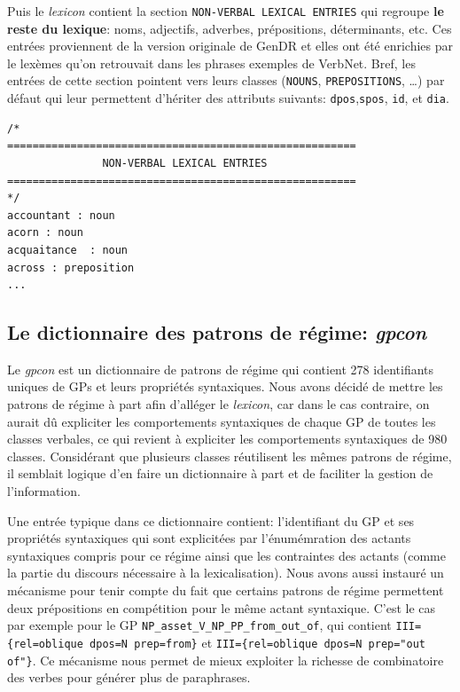 Puis le \emph{lexicon} contient la section \texttt{NON-VERBAL LEXICAL ENTRIES} qui regroupe \textbf{le reste du lexique}: noms, adjectifs, adverbes, prépositions, déterminants, etc. Ces entrées proviennent de la version originale de GenDR \citep{lareau18} et elles ont été enrichies par le lexèmes qu'on retrouvait dans les phrases exemples de VerbNet. Bref, les entrées de cette section pointent vers leurs classes (\texttt{NOUNS}, \texttt{PREPOSITIONS}, \ldots) par défaut qui leur permettent d'hériter des attributs suivants: \texttt{dpos},\texttt{spos}, \texttt{id}, et \texttt{dia}.

\begin{lstlisting}[language=mate, caption = Extrait du \emph{lexicon}: unités lexicales non-verbales]
/*
=======================================================
               NON-VERBAL LEXICAL ENTRIES     
=======================================================
*/
accountant : noun
acorn : noun
acquaitance  : noun
across : preposition
...
\end{lstlisting}

\subsection{Le dictionnaire des patrons de régime: \emph{gpcon}}

Le \emph{gpcon} est un dictionnaire de patrons de régime qui contient 278 identifiants uniques de \acp{GP} et leurs propriétés syntaxiques. Nous avons décidé de mettre les patrons de régime à part afin d'alléger le \emph{lexicon}, car dans le cas contraire, on aurait dû expliciter les comportements syntaxiques de chaque \ac{GP} de toutes les classes verbales, ce qui revient à expliciter les comportements syntaxiques de 980 classes. Considérant que plusieurs classes réutilisent les mêmes patrons de régime, il semblait logique d'en faire un dictionnaire à part et de faciliter la gestion de l'information.

Une entrée typique dans ce dictionnaire contient: l'identifiant du \ac{GP} et ses propriétés syntaxiques qui sont explicitées par l'énumémration des actants syntaxiques compris pour ce régime ainsi que les contraintes des actants (comme la partie du discours nécessaire à la lexicalisation). Nous avons aussi instauré un mécanisme pour tenir compte du fait que certains patrons de régime permettent deux prépositions en compétition pour le même actant syntaxique. C'est le cas par exemple pour le \ac{GP} \texttt{NP\_asset\_V\_NP\_PP\_from\_out\_of}, qui contient \lstinline|III={rel=oblique dpos=N prep=from}| et \lstinline|III={rel=oblique dpos=N prep="out of"}|. Ce mécanisme nous permet de mieux exploiter la richesse de combinatoire des verbes pour générer plus de paraphrases.

